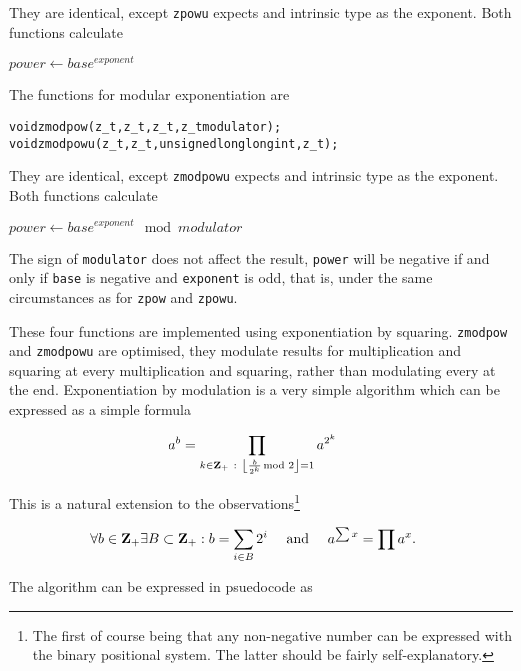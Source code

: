 \noindent
They are identical, except {\tt zpowu} expects
and intrinsic type as the exponent. Both functions
calculate

\vspace{1em}
$power \gets base^{exponent}$
\vspace{1em}

\noindent
The functions for modular exponentiation are
\begin{alltt}
   void zmodpow(z_t, z_t, z_t, z_t modulator);
   void zmodpowu(z_t, z_t, unsigned long long int, z_t);
\end{alltt}

\noindent
They are identical, except {\tt zmodpowu} expects
and intrinsic type as the exponent. Both functions
calculate

\vspace{1em}
$power \gets base^{exponent} \mod modulator$
\vspace{1em}

The sign of {\tt modulator} does not affect the
result, {\tt power} will be negative if and only
if {\tt base} is negative and {\tt exponent} is
odd, that is, under the same circumstances as for
{\tt zpow} and {\tt zpowu}.

These four functions are implemented using
exponentiation by squaring. {\tt zmodpow} and
{\tt zmodpowu} are optimised, they modulate
results for multiplication and squaring at
every multiplication and squaring, rather than
modulating every at the end. Exponentiation
by modulation is a very simple algorithm which
can be expressed as a simple formula

\vspace{-1em}
\[ \hspace*{-0.4cm}
    a^b =
    \prod_{k \in \textbf{Z}_{+} ~:~ \left \lfloor \frac{b}{2^k} \hspace*{-1ex} \mod 2 \right \rfloor = 1}
    a^{2^k}
\]

\noindent
This is a natural extension to the
observations\footnote{The first of course being
that any non-negative number can be expressed
with the binary positional system. The latter
should be fairly self-explanatory.}

\vspace{-1em}
\[ \hspace*{-0.4cm}
    \forall b \in \textbf{Z}_{+} \exists B \subset \textbf{Z}_{+} : b = \sum_{i \in B} 2^i
    ~~~~ \textrm{and} ~~~~
    a^{\sum x} = \prod a^x.
\]

\noindent
The algorithm can be expressed in psuedocode as

